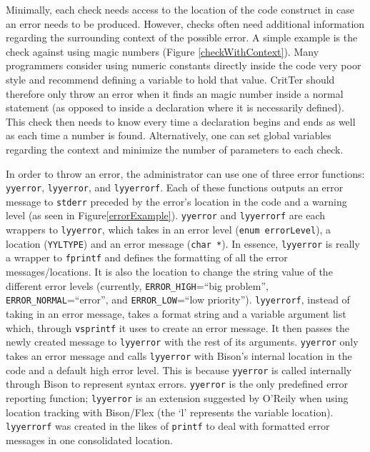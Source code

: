 \documentclass[12pt]{report}
\def\lstlistingname{Figure}
\newcommand{\refCode}{\lstlistingname \hspace{1mm}}
\newcommand{\programName}{CritTer\xspace}
\begin{document}
Minimally, each check needs access to the location of the code construct in case an error needs to be 
produced. However, checks often need additional information regarding the surrounding context of 
the possible error. A simple example is the check against using magic numbers (\refCode 
\ref{checkWithContext}). Many programmers consider using numeric constants directly inside the code 
very poor style and recommend defining a variable to hold that value. \programName should therefore 
only throw an error when it finds an magic number inside a normal statement (as opposed to inside a 
declaration where it is necessarily defined). This check then needs to know every time a declaration 
begins and ends as well as each time a number is found. Alternatively, one can set global 
variables regarding the context and minimize the number of parameters to each check.

\newcommand{\yyerror}{\lstinline{yyerror}\xspace}
\newcommand{\lyyerror}{\lstinline{lyyerror}\xspace}
\newcommand{\lyyerrorf}{\lstinline{lyyerrorf}\xspace}

In order to throw an error, the administrator can use one of three error functions: \yyerror, \lyyerror, and 
\lyyerrorf. Each of these functions outputs an error message to \lstinline{stderr} preceded by the error's 
location in the code and a warning level (as seen in \refCode \ref{errorExample}). \yyerror and \lyyerrorf 
are each wrappers to \lyyerror, which takes in an error level (\lstinline{enum errorLevel}), a location 
(\lstinline{YYLTYPE}) and an error message (\lstinline{char *}). In essence, \lyyerror is really a wrapper 
to \lstinline{fprintf} and defines the formatting of all the error messages/locations. It is also the location 
to change the string value of the different error levels (currently, \lstinline{ERROR_HIGH}=``big 
problem'', \lstinline{ERROR_NORMAL}=``error'', and \lstinline{ERROR_LOW}=``low priority'').  
\lyyerrorf, instead of taking in an error message, takes a format string and a variable argument list 
which, through \lstinline{vsprintf} it uses to create an error message. It then passes the newly created 
message to \lyyerror with the rest of its arguments. \yyerror only takes an error message and calls 
\lyyerror with Bison's internal location in the code and a default high error level. This is because 
\yyerror is called internally through Bison to represent syntax errors. \yyerror is the only predefined 
error reporting function; \lyyerror is an extension suggested by O'Reily\cite{flex-and-bison} when using 
location tracking with Bison/Flex (the `l' represents the variable location). \lyyerrorf was created in the 
likes of \lstinline{printf} to deal with formatted error messages in one consolidated location.
\end{document}
